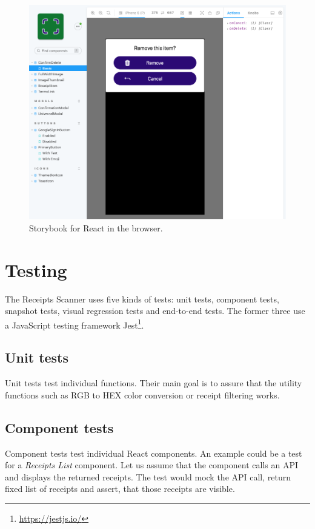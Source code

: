\documentclass[
  digital, %
  table,   %
  oneside, %
  lof,     %
  lot,     %
]{fithesis3}
\begin{document}
\begin{figure}
    \begin{center}
        \includegraphics[width=\textwidth]{figures/other/storybook_web}
    \end{center}
    \caption{Storybook for React in the browser.}
    \label{fig:storybook_web}
\end{figure}

\chapter{Testing}
The Receipts Scanner uses five kinds of tests: unit tests, component tests, snapshot tests, visual regression tests and end-to-end tests.
The former three use a JavaScript testing framework Jest\footnote{\url{https://jestjs.io/}}.

\section{Unit tests}
Unit tests test individual functions. Their main goal is to assure that the utility functions such as RGB to HEX color conversion or receipt filtering works.

\section{Component tests}
Component tests test individual React components. An example could be a test for a \textit{Receipts List} component. Let us assume that the component calls an API and displays the returned receipts. The test would mock the API call, return fixed list of receipts and assert, that those receipts are visible.
\end{document}
